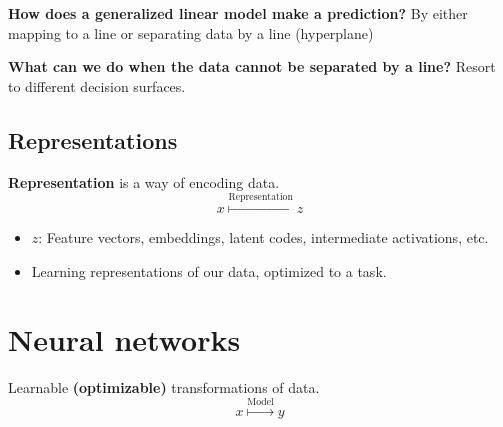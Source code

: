\begin{notes} \textbf{How does a generalized linear model make a prediction?}
    By either mapping to a line or separating data by a line (hyperplane)
\end{notes}

\begin{notes} \textbf{What can we do when the data cannot be separated by a line?}
    Resort to different decision surfaces.
\end{notes}

\subsection{Representations}
\begin{definition}
    \textbf{Representation} is a way of encoding data.
    \begin{equation}
        x \overset{\text{Representation}}{\mapsto} z
    \end{equation}
    \begin{itemize}
        \item $z$: Feature vectors, embeddings, latent codes, intermediate activations, etc.
    \end{itemize}
\end{definition}

\begin{notes}
    \begin{itemize}
        \item Learning representations of our data, optimized to a task.
    \end{itemize}
\end{notes}

\section{Neural networks}
\begin{definition}
    Learnable \textbf{(optimizable)} transformations of data.
    \begin{equation}
        x \overset{\text{Model}}{\mapsto} y
    \end{equation}
\end{definition}

